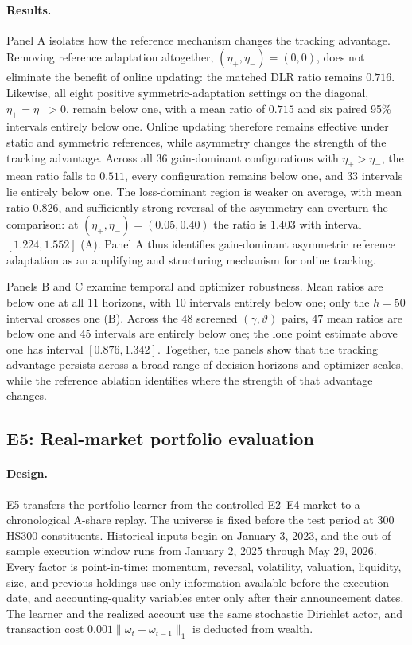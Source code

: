 \paragraph{Results.}
Panel A isolates how the reference mechanism changes the tracking advantage.  Removing reference adaptation altogether, $(\eta_+,\eta_-)=(0,0)$, does not eliminate the benefit of online updating: the matched DLR ratio remains $0.716$.  Likewise, all eight positive symmetric-adaptation settings on the diagonal, $\eta_+=\eta_->0$, remain below one, with a mean ratio of $0.715$ and six paired 95\% intervals entirely below one.  Online updating therefore remains effective under static and symmetric references, while asymmetry changes the strength of the tracking advantage.  Across all $36$ gain-dominant configurations with $\eta_+>\eta_-$, the mean ratio falls to $0.511$, every configuration remains below one, and $33$ intervals lie entirely below one.  The loss-dominant region is weaker on average, with mean ratio $0.826$, and sufficiently strong reversal of the asymmetry can overturn the comparison: at $(\eta_+,\eta_-)=(0.05,0.40)$ the ratio is $1.403$ with interval $[1.224,1.552]$ (A).  Panel A thus identifies gain-dominant asymmetric reference adaptation as an amplifying and structuring mechanism for online tracking.

Panels B and C examine temporal and optimizer robustness.  Mean ratios are below one at all $11$ horizons, with $10$ intervals entirely below one; only the $h=50$ interval crosses one (B).  Across the $48$ screened $(\gamma,\vartheta)$ pairs, $47$ mean ratios are below one and $45$ intervals are entirely below one; the lone point estimate above one has interval $[0.876,1.342]$.  Together, the panels show that the tracking advantage persists across a broad range of decision horizons and optimizer scales, while the reference ablation identifies where the strength of that advantage changes.

\FloatBarrier

\subsection{E5: Real-market portfolio evaluation}\label{sec:e5}
\paragraph{Design.}
E5 transfers the portfolio learner from the controlled E2--E4 market to a chronological A-share replay.  The universe is fixed before the test period at 300 HS300 constituents.  Historical inputs begin on January 3, 2023, and the out-of-sample execution window runs from January 2, 2025 through May 29, 2026.  Every factor is point-in-time: momentum, reversal, volatility, valuation, liquidity, size, and previous holdings use only information available before the execution date, and accounting-quality variables enter only after their announcement dates.  The learner and the realized account use the same stochastic Dirichlet actor, and transaction cost $0.001\|\omega_t-\omega_{t-1}\|_1$ is deducted from wealth.

